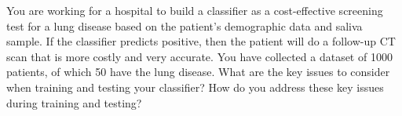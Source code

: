 You are working for a hospital to build a classifier as a cost-effective screening test for a lung disease based on the patient’s demographic data and saliva sample. If the classifier predicts positive, then the patient will do a follow-up CT scan that is more costly and very accurate. You have collected a dataset of 1000 patients, of which 50 have the lung disease. What are the key issues to consider when training and testing your classifier? How do you address these key issues during training and testing?
